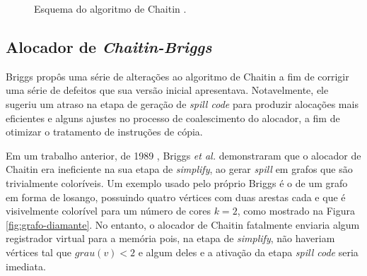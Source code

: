 \documentclass[
	12pt,				%
	openright,			%
	twoside,			%
	a4paper,			%
	tcc,			%
	]{ABNT-DC-UEL}
\begin{document}
\begin{figure}
    \centering
    \caption{Esquema do algoritmo de Chaitin \cite{chaitin:82}.}
    \label{fig:alocador-chaitin}
\end{figure}

\subsection{Alocador de \textit{Chaitin-Briggs}}

Briggs \cite{briggs:92} propôs uma série de alterações ao algoritmo de Chaitin a fim de corrigir uma série de defeitos que sua versão inicial apresentava. Notavelmente, ele sugeriu um atraso na etapa de geração de \textit{spill code} para produzir alocações mais eficientes e alguns ajustes no processo de coalescimento do alocador, a fim de otimizar o tratamento de instruções de cópia.

Em um trabalho anterior, de 1989 \cite{briggs:89}, Briggs \textit{et al.} demonstraram que o alocador de Chaitin era ineficiente na sua etapa de \textit{simplify}, ao gerar \textit{spill} em grafos que são trivialmente coloríveis. Um exemplo usado pelo próprio Briggs é o de um grafo em forma de losango, possuindo quatro vértices com duas arestas cada e que é visivelmente colorível para um número de cores $k=2$, como mostrado na Figura \ref{fig:grafo-diamante}. No entanto, o alocador de Chaitin fatalmente enviaria algum registrador virtual para a memória pois, na etapa de \textit{simplify}, não haveriam vértices tal que $\mathit{grau}(v)<2$ e algum deles e a ativação da etapa \textit{spill code} seria imediata.
\end{document}
